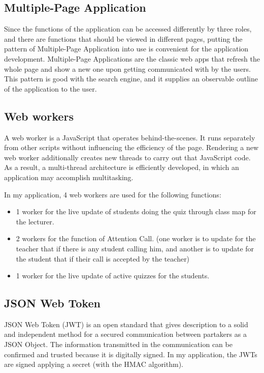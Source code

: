 \documentclass[a4paper, 11pt,openany]{book} %
\begin{document}
\subsection{Multiple-Page Application}
Since the functions of the application can be accessed differently by three roles, and there are functions that should be viewed in different pages, putting the pattern of Multiple-Page Application into use is convenient for the application development. Multiple-Page Applications are the classic web apps that refresh the whole page and show a new one upon getting communicated with by the users. This pattern is good with the search engine, and it supplies an observable outline of the application to the user.\cite{mpa}
\subsection{Web workers}
A web worker is a JavaScript that operates behind-the-scenes. It runs separately from other scripts without influencing the efficiency of the page. Rendering a new web worker additionally creates new threads to carry out that JavaScript code. As a result, a multi-thread architecture is efficiently developed, in which an application may accomplish multitasking. \par
In my application, 4 web workers are used for the following functions:
\begin{itemize}
    \item 1 worker for the live update of students doing the quiz through class map for the lecturer.
    \item 2 workers for the function of Attention Call. (one worker is to update for the teacher that if there is any student calling him, and another is to update for the student that if their call is accepted by the teacher)
    \item 1 worker for the live update of active quizzes for the students.
\end{itemize}
\subsection{JSON Web Token}
JSON Web Token (JWT) is an open standard that gives description to a solid and independent method for a secured communication between partakers as a JSON Object. The information transmitted in the communication can be confirmed and trusted because it is digitally signed. In my application, the JWTs are signed applying a secret (with the HMAC algorithm). \par
\end{document}
